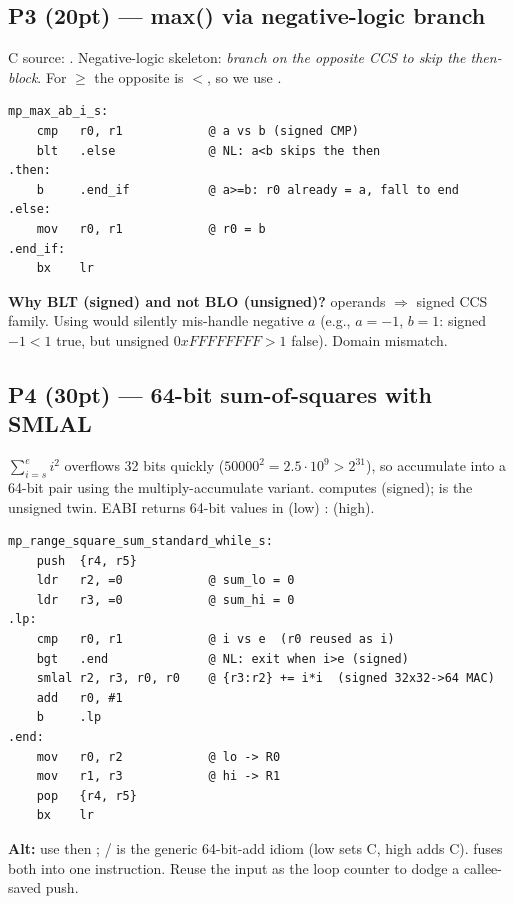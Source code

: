 \subsection{P3 (20pt) --- max() via negative-logic branch}
C source: . Negative-logic skeleton: \emph{branch on the opposite CCS to skip the then-block}. For $\geq$ the opposite is $<$, so we use .
\begin{lstlisting}
mp_max_ab_i_s:
    cmp   r0, r1            @ a vs b (signed CMP)
    blt   .else             @ NL: a<b skips the then
.then:
    b     .end_if           @ a>=b: r0 already = a, fall to end
.else:
    mov   r0, r1            @ r0 = b
.end_if:
    bx    lr
\end{lstlisting}
\textbf{Why BLT (signed) and not BLO (unsigned)?}  operands $\Rightarrow$ signed CCS family. Using  would silently mis-handle negative $a$ (e.g., $a={-}1$, $b=1$: signed $-1<1$ true, but unsigned $0xFFFFFFFF > 1$ false). Domain mismatch.

\subsection{P4 (30pt) --- 64-bit sum-of-squares with SMLAL}
$\sum_{i=s}^{e} i^2$ overflows 32 bits quickly ($50000^2{=}2.5{\cdot}10^9 > 2^{31}$), so accumulate into a 64-bit pair using the multiply-accumulate variant.  computes  (signed);  is the unsigned twin. EABI returns 64-bit values in  (low) :  (high).
\begin{lstlisting}
mp_range_square_sum_standard_while_s:
    push  {r4, r5}
    ldr   r2, =0            @ sum_lo = 0
    ldr   r3, =0            @ sum_hi = 0
.lp:
    cmp   r0, r1            @ i vs e  (r0 reused as i)
    bgt   .end              @ NL: exit when i>e (signed)
    smlal r2, r3, r0, r0    @ {r3:r2} += i*i  (signed 32x32->64 MAC)
    add   r0, #1
    b     .lp
.end:
    mov   r0, r2            @ lo -> R0
    mov   r1, r3            @ hi -> R1
    pop   {r4, r5}
    bx    lr
\end{lstlisting}
\begin{hwp}
\textbf{Alt:} use  then  ; / is the generic 64-bit-add idiom (low  sets C, high  adds C).  fuses both into one instruction. Reuse the input  as the loop counter to dodge a callee-saved push.
\end{hwp}

